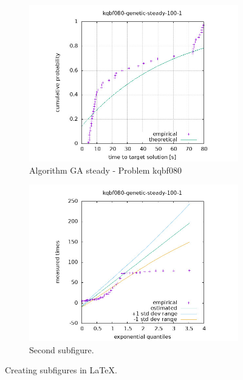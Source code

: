 \begin{figure}[H]
    \centering
    \begin{subfigure}{0.49\textwidth}
        \includegraphics[width=\textwidth]{figure/ttt_plot/kqbf080-genetic-steady-100-1-exp.jpeg}
        \caption{Algorithm GA steady - Problem kqbf080}
        \label{fig:ga-steady-kqbf080-exp}
    \end{subfigure}
    \hfill
    \begin{subfigure}{0.49\textwidth}
        \includegraphics[width=\textwidth]{figure/ttt_plot/kqbf080-genetic-steady-100-1-qq.jpeg}
        \caption{Second subfigure.}
        \label{fig:ga-steady-kqbf080-qq}
    \end{subfigure}
    \caption{Creating subfigures in \LaTeX.}
    \label{fig:ga-steady-kqbf080}
\end{figure}


